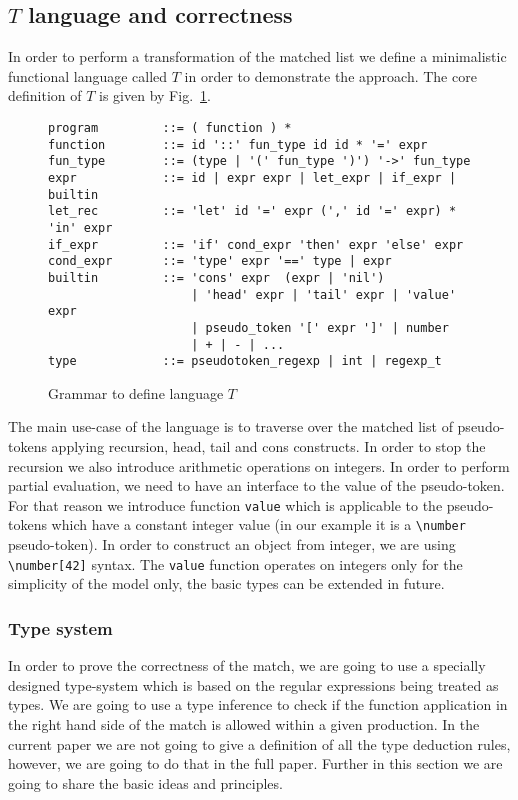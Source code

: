 
\subsection{$T$ language and correctness}
In order to perform a transformation of the matched list we define a
minimalistic functional language called $T$ in order to demonstrate
the approach.  The core definition of $T$ is given by Fig.~\ref{fig:t}.

\begin{figure}
\begin{verbatim}
program         ::= ( function ) *
function        ::= id '::' fun_type id id * '=' expr
fun_type        ::= (type | '(' fun_type ')') '->' fun_type
expr            ::= id | expr expr | let_expr | if_expr | builtin
let_rec         ::= 'let' id '=' expr (',' id '=' expr) * 'in' expr
if_expr         ::= 'if' cond_expr 'then' expr 'else' expr
cond_expr       ::= 'type' expr '==' type | expr
builtin         ::= 'cons' expr  (expr | 'nil') 
                    | 'head' expr | 'tail' expr | 'value' expr
                    | pseudo_token '[' expr ']' | number
                    | + | - | ...
type            ::= pseudotoken_regexp | int | regexp_t
\end{verbatim}
\caption{\label{fig:t}Grammar to define language $T$}
\end{figure}

The main use-case of the language is to traverse over the matched
list of pseudo-tokens applying recursion, head, tail and cons
constructs.  In order to stop the recursion we also introduce
arithmetic operations on integers.  In order to perform partial
evaluation, we need to have an interface to the value of the
pseudo-token.  For that reason we introduce function \verb|value|
which is applicable to the pseudo-tokens which have a constant
integer value (in our example it is a \verb|\number| pseudo-token).
In order to construct an object from integer, we are using
\verb|\number[42]| syntax.  The \verb|value| function operates
on integers only for the simplicity of the model only, the basic
types can be extended in future.

\subsubsection{Type system}
In order to prove the correctness of the match, we are going to use
a specially designed type-system which is based on the regular 
expressions being treated as types.  We are going to use a type
inference to check if the function application in the right hand
side of the match is allowed within a given production.  In the
current paper we are not going to give a definition of all the
type deduction rules, however, we are going to do that in the 
full paper.  Further in this section we are going to share the
basic ideas and principles.

